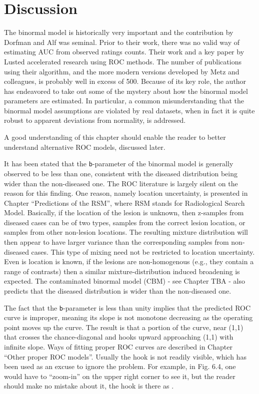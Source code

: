 \documentclass[
]{book}
\begin{document}
\hypertarget{discussion}{%
\section{Discussion}\label{discussion}}

The binormal model is historically very important and the contribution by Dorfman and Alf \citep{RN212} was seminal. Prior to their work, there was no valid way of estimating AUC from observed ratings counts. Their work and a key paper by Lusted \citep{RN1487} accelerated research using ROC methods. The number of publications using their algorithm, and the more modern versions developed by Metz and colleagues, is probably well in excess of 500. Because of its key role, the author has endeavored to take out some of the mystery about how the binormal model parameters are estimated. In particular, a common misunderstanding that the binormal model assumptions are violated by real datasets, when in fact it is quite robust to apparent deviations from normality, is addressed.

A good understanding of this chapter should enable the reader to better understand alternative ROC models, discussed later.

It has been stated that the \texttt{b}-parameter of the binormal model is generally observed to be less than one, consistent with the diseased distribution being wider than the non-diseased one. The ROC literature is largely silent on the reason for this finding. One reason, namely location uncertainty, is presented in Chapter ``Predictions of the RSM'', where RSM stands for Radiological Search Model. Basically, if the location of the lesion is unknown, then z-samples from diseased cases can be of two types, samples from the correct lesion location, or samples from other non-lesion locations. The resulting mixture distribution will then appear to have larger variance than the corresponding samples from non-diseased cases. This type of mixing need not be restricted to location uncertainty. Even is location is known, if the lesions are non-homogenous (e.g., they contain a range of contrasts) then a similar mixture-distribution induced broadening is expected. The contaminated binormal model (CBM) - see Chapter TBA - also predicts that the diseased distribution is wider than the non-diseased one.

The fact that the \texttt{b}-parameter is less than unity implies that the predicted ROC curve is improper, meaning its slope is not monotone decreasing as the operating point moves up the curve. The result is that a portion of the curve, near (1,1) that crosses the chance-diagonal and hooks upward approaching (1,1) with infinite slope. Ways of fitting proper ROC curves are described in Chapter ``Other proper ROC models''. Usually the hook is not readily visible, which has been used as an excuse to ignore the problem. For example, in Fig. 6.4, one would have to ``zoom-in'' on the upper right corner to see it, but the reader should make no mistake about it, the hook is there as .
\end{document}
